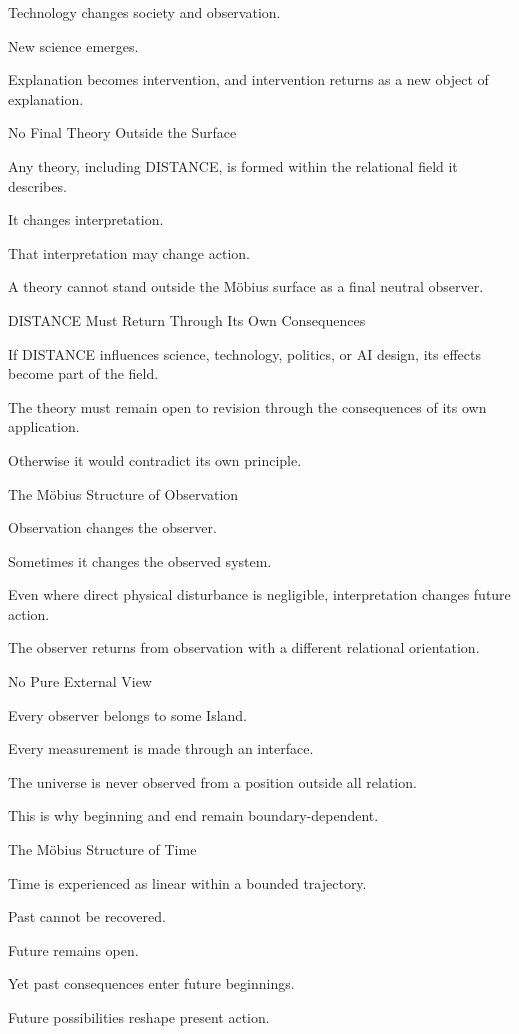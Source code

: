 Technology changes society and observation.

New science emerges.

Explanation becomes intervention, and intervention returns as a new object of explanation.

No Final Theory Outside the Surface

Any theory, including DISTANCE, is formed within the relational field it describes.

It changes interpretation.

That interpretation may change action.

A theory cannot stand outside the Möbius surface as a final neutral observer.

DISTANCE Must Return Through Its Own Consequences

If DISTANCE influences science, technology, politics, or AI design, its effects become part of the field.

The theory must remain open to revision through the consequences of its own application.

Otherwise it would contradict its own principle.

The Möbius Structure of Observation

Observation changes the observer.

Sometimes it changes the observed system.

Even where direct physical disturbance is negligible, interpretation changes future action.

The observer returns from observation with a different relational orientation.

No Pure External View

Every observer belongs to some Island.

Every measurement is made through an interface.

The universe is never observed from a position outside all relation.

This is why beginning and end remain boundary-dependent.

The Möbius Structure of Time

Time is experienced as linear within a bounded trajectory.

Past cannot be recovered.

Future remains open.

Yet past consequences enter future beginnings.

Future possibilities reshape present action.

